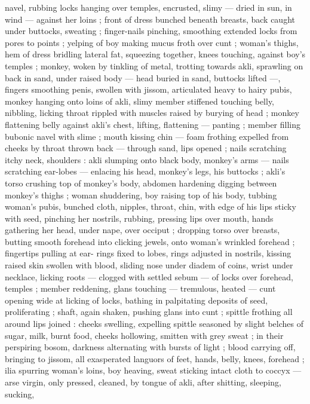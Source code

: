 navel, rubbing locks hanging over temples, encrusted, slimy --- dried
in sun, in wind --- against her loins ; front of dress bunched beneath
breasts, back caught under buttocks, sweating ; finger-nails pinching,
smoothing extended locks from pores to points ; yelping of boy
making mucus froth over cunt ; woman's thighs, hem of dress
bridling lateral fat, squeezing together, knees touching, against
boy's temples ; monkey, woken by tinkling of metal, trotting towards
akli, sprawling on back in sand, under raised body --- head buried in
sand, buttocks lifted ---, fingers smoothing penis, swollen with
jissom, articulated heavy to hairy pubis, monkey hanging onto loins
of akli, slimy member stiffened touching belly, nibbling, licking throat
rippled with muscles raised by burying of head ; monkey flattening
belly against akli’s chest, lifting, flattening --- panting ; member
filling bubonic navel with slime ; mouth kissing chin --- foam frothing
expelled from cheeks by throat thrown back --- through sand, lips
opened ; nails scratching itchy neck, shoulders : akli slumping onto
black body, monkey's arms --- nails scratching ear-lobes --- enlacing
his head, monkey's legs, his buttocks ; akli's torso crushing top of
monkey's body, abdomen hardening digging between monkey's
thighs ; woman shuddering, boy raising top of his body, tubbing
woman's pubis, bunched cloth, nipples, throat, chin, with edge of his
lips sticky with seed, pinching her nostrils, rubbing, pressing lips
over mouth, hands gathering her head, under nape, over occiput ;
dropping torso over breasts, butting smooth forehead into clicking
jewels, onto woman's wrinkled forehead ; fingertips pulling at ear-
rings fixed to lobes, rings adjusted in nostrils, kissing raised skin
swollen with blood, sliding nose under diadem of coins, wrist under
necklace, licking roots --- clogged with settled sebum --- of locks
over forehead, temples ; member reddening, glans touching ---
tremulous, heated --- cunt opening wide at licking of locks, bathing
in palpitating deposits of seed, proliferating ; shaft, again shaken,
pushing glans into cunt ; spittle frothing all around lips joined :
cheeks swelling, expelling spittle seasoned by slight belches of
sugar, milk, burnt food, cheeks hollowing, smitten with grey sweat ;
in their perspiring bosom, darkness alternating with bursts of light ;
blood carrying off, bringing to jissom, all exasperated languors of
feet, hands, belly, knees, forehead ; ilia spurring woman's loins, boy
heaving, sweat sticking intact cloth to coccyx --- arse virgin, only
pressed, cleaned, by tongue of akli, after shitting, sleeping, sucking,
